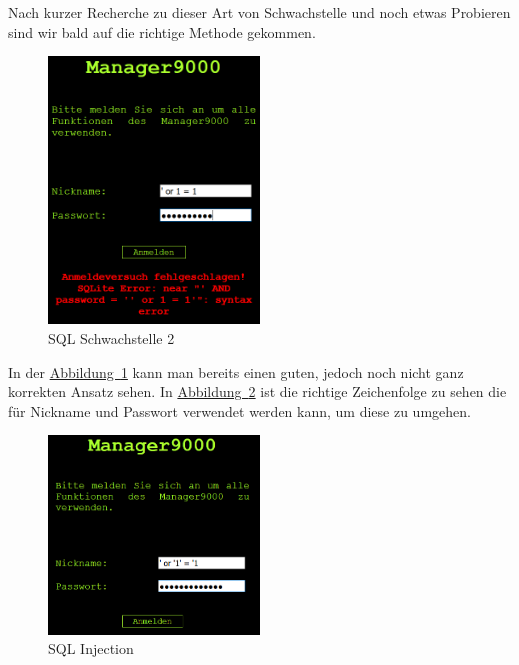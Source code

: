 \documentclass[12pt,a4paper,titlepage,oneside]{scrartcl}
\begin{document}
Nach kurzer Recherche zu dieser Art von Schwachstelle und noch etwas Probieren sind wir bald auf die richtige Methode gekommen.

\begin{figure}[h!]
  \centering
  \includegraphics[width=0.5\textwidth]{./imgs/manager9000/m9000_sql_error2.png}
\caption{SQL Schwachstelle 2}
\label{fig:sql_weakness2}
\end{figure}

\pagebreak

In der \hyperref[fig:sql_weakness2]{Abbildung~\ref*{fig:sql_weakness2}} kann man bereits einen guten, jedoch noch nicht ganz korrekten Ansatz sehen.
In \hyperref[fig:fig:sql_injection]{Abbildung~\ref*{fig:sql_injection}} ist die richtige Zeichenfolge zu sehen die für Nickname und Passwort verwendet werden kann, um diese zu umgehen.

\begin{figure}[h!]
  \centering
  \includegraphics[width=0.5\textwidth]{./imgs/manager9000/m9000_sql_injection.png}
\caption{SQL Injection}
\label{fig:sql_injection}
\end{figure}
\end{document}
